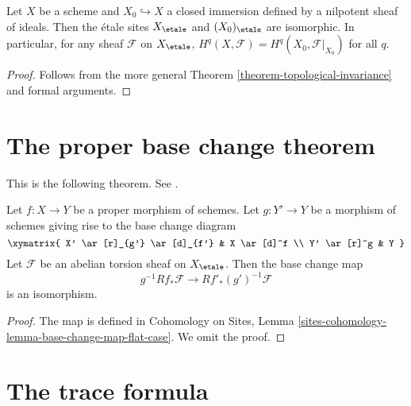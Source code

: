 \begin{proposition}
\label{proposition-topological-invariance}
Let $X$ be a scheme and $X_0\hookrightarrow X$ a closed immersion defined by a
nilpotent sheaf of ideals. Then the \'etale sites $X_\etale$ and
$(X_0)_\etale$ are
isomorphic. In particular, for any sheaf $\mathcal{F}$ on
$X_\etale$, $H^q(X,
\mathcal{F}) = H^q(X_0, \mathcal{F}|_{X_0})$ for all $q$.
\end{proposition}

\begin{proof}
Follows from the more general
Theorem \ref{theorem-topological-invariance}
and formal arguments.
\end{proof}








\section{The proper base change theorem}
\label{section-proper-base-change}

\noindent
This is the following theorem. See \cite[XII, Theorem 5.1]{SGA4}.

\begin{theorem}
\label{theorem-proper-base-change}
Let $f : X \to Y$ be a proper morphism of schemes. Let $g : Y' \to Y$ be
a morphism of schemes giving rise to the base change diagram
$$
\xymatrix{
X' \ar[r]_{g'} \ar[d]_{f'} & X \ar[d]^f \\
Y' \ar[r]^g & Y
}
$$
Let $\mathcal{F}$ be an abelian torsion sheaf on $X_\etale$.
Then the base change map
$$
g^{-1}Rf_*\mathcal{F} \longrightarrow Rf'_*(g')^{-1}\mathcal{F}
$$
is an isomorphism.
\end{theorem}

\begin{proof}
The map is defined in
Cohomology on Sites, Lemma
\ref{sites-cohomology-lemma-base-change-map-flat-case}.
We omit the proof.
\end{proof}











\section{The trace formula}
\label{section-trace-formula}

